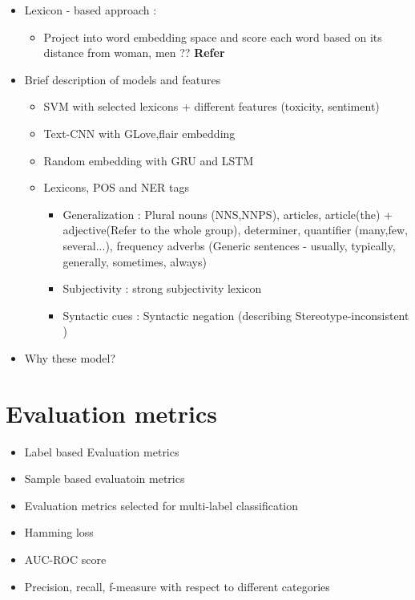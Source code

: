     \begin{itemize}
        \item Lexicon - based approach : 
        \begin{itemize}
            \item Project into word embedding space and score each word based on its distance from woman, men ??
            \textbf{Refer }\cite{cryan2020detecting}
        \end{itemize}
        \item Brief description of  models and features
        \begin{itemize}
            \item SVM with selected lexicons + different features (toxicity, sentiment)
            \item Text-CNN with GLove,flair embedding
            \item Random embedding with GRU and LSTM 
        \end{itemize}
        \begin{itemize}
            \item Lexicons, POS and NER tags 
            \begin{itemize}
                \item Generalization : Plural nouns (NNS,NNPS), articles, article(the) + adjective(Refer to the whole group), determiner, quantifier (many,few, several...), frequency adverbs (Generic sentences - usually, typically, generally, sometimes, always)
                \item Subjectivity : strong subjectivity lexicon \cite{tangpersonalized}
                \item Syntactic cues : Syntactic negation (describing Stereotype-inconsistent )
            \end{itemize}
        \end{itemize}
        \item Why these model?
    \end{itemize}
    
\section{Evaluation metrics}\label{evaluation_metrics}

\cite{zhang2013review}
    \begin{itemize}
        \item Label based Evaluation metrics
        \item Sample based evaluatoin metrics
        \item Evaluation metrics selected for multi-label classification 
        \item Hamming loss 
        \item AUC-ROC score 
        \item Precision, recall, f-measure with respect to different categories
    \end{itemize}
    
    
